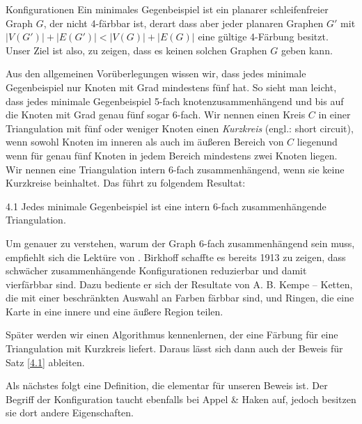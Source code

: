 \begin{section}{Konfigurationen}
 Ein minimales Gegenbeispiel ist ein planarer schleifenfreier Graph $G$, der nicht 4-färbbar ist, derart dass aber jeder planaren Graphen $G'$ mit $|V(G')| + |E(G')| < |V(G)| + |E(G)|$ eine gültige 4-Färbung besitzt. Unser Ziel ist also, zu zeigen, dass es keinen solchen Graphen $G$ geben kann. 
   
 Aus den allgemeinen Vorüberlegungen wissen wir, dass jedes minimale Gegenbeispiel nur Knoten mit Grad mindestens fünf hat. So sieht man leicht, dass jedes minimale Gegenbeispiel 5-fach knotenzusammenhängend und bis auf die Knoten mit Grad genau fünf sogar 6-fach. Wir nennen einen Kreis $C$ in einer Triangulation mit fünf oder weniger Knoten einen \textit{Kurzkreis} (engl.: short circuit), wenn sowohl Knoten im inneren als auch im äußeren Bereich von $C$ liegenund wenn für genau fünf Knoten in jedem Bereich mindestens zwei Knoten liegen. Wir nennen eine Triangulation intern 6-fach zusammenhängend, wenn sie keine Kurzkreise beinhaltet. Das führt zu folgendem Resultat:
  
 \begin{satzl}{}{4.1}
  Jedes minimale Gegenbeispiel ist eine intern 6-fach zusammenhängende Triangulation. 
 \end{satzl}

 Um genauer zu verstehen, warum der Graph 6-fach zusammenhängend sein muss, empfiehlt sich die Lektüre von \cite{AmJMath35}. Birkhoff schaffte es bereits 1913 zu zeigen, dass schwächer zusammenhängende Konfigurationen reduzierbar und damit vierfärbbar sind. Dazu bediente er sich der Resultate von A. B. Kempe -- Ketten, die mit einer beschränkten Auswahl an Farben färbbar sind, und Ringen, die eine Karte in eine innere und eine äußere Region teilen. 
 
 Später werden wir einen Algorithmus kennenlernen, der eine Färbung für eine Triangulation mit Kurzkreis liefert. Daraus lässt sich dann auch der Beweis für Satz \ref{4.1} ableiten.
 
 Als nächstes folgt eine Definition, die elementar für unseren Beweis ist. Der Begriff der Konfiguration taucht ebenfalls bei Appel \& Haken auf, jedoch besitzen sie dort andere Eigenschaften.
  

\end{section}
